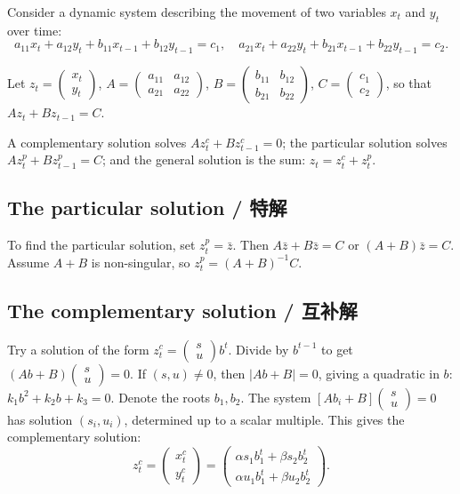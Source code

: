 \begin{original}
Consider a dynamic system describing the movement of two variables $x_t$ and $y_t$ over time:
\[
a_{11} x_t + a_{12} y_t + b_{11} x_{t-1} + b_{12} y_{t-1} = c_1,\quad a_{21} x_t + a_{22} y_t + b_{21} x_{t-1} + b_{22} y_{t-1} = c_2.
\]

Let $z_t = \begin{pmatrix} x_t \\ y_t \end{pmatrix}$, $A = \begin{pmatrix} a_{11} & a_{12} \\ a_{21} & a_{22} \end{pmatrix}$, $B = \begin{pmatrix} b_{11} & b_{12} \\ b_{21} & b_{22} \end{pmatrix}$, $C = \begin{pmatrix} c_1 \\ c_2 \end{pmatrix}$, so that $A z_t + B z_{t-1} = C$.

A complementary solution solves $A z_t^c + B z_{t-1}^c = 0$; the particular solution solves $A z_t^p + B z_{t-1}^p = C$; and the general solution is the sum: $z_t = z_t^c + z_t^p$.

\subsection{The particular solution / 特解}

To find the particular solution, set $z_t^p = \bar{z}$. Then $A\bar{z} + B\bar{z} = C$ or $(A + B)\bar{z} = C$. Assume $A + B$ is non-singular, so $z_t^p = (A + B)^{-1}C$.

\subsection{The complementary solution / 互补解}

Try a solution of the form $z_t^c = \begin{pmatrix} s \\ u \end{pmatrix} b^t$. Divide by $b^{t-1}$ to get $(Ab + B)\begin{pmatrix} s \\ u \end{pmatrix} = 0$. If $(s, u) \neq 0$, then $|Ab + B| = 0$, giving a quadratic in $b$: $k_1 b^2 + k_2 b + k_3 = 0$. Denote the roots $b_1, b_2$. The system $[A b_i + B]\begin{pmatrix} s \\ u \end{pmatrix} = 0$ has solution $(s_i, u_i)$, determined up to a scalar multiple. This gives the complementary solution:
\[
z_t^c = \begin{pmatrix} x_t^c \\ y_t^c \end{pmatrix} = \begin{pmatrix} \alpha s_1 b_1^t + \beta s_2 b_2^t \\ \alpha u_1 b_1^t + \beta u_2 b_2^t \end{pmatrix}.
\]


\end{original}
